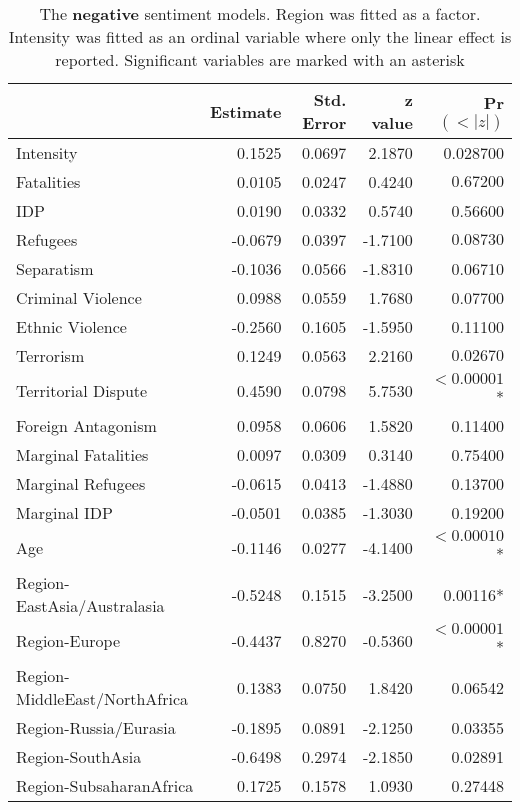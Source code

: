 \begin{table}
\centering
\begin{tabular}{l|rrrr}
& Estimate & Std. Error & z value & Pr$(<|z|)$  \\ \hline
Intensity                   & 0.1525 & 0.0697 & 2.1870 & 0.028700 \\ 
Fatalities                    & 0.0105 &  0.0247 & 0.4240 & $0.67200$ \\ 
IDP                           & 0.0190 & 0.0332 & 0.5740 & 0.56600 \\ 
Refugees                      & -0.0679 & 0.0397 & -1.7100 & $0.08730$ \\ 
Separatism                    & -0.1036 & 0.0566 & -1.8310 & 0.06710 \\ 
Criminal Violence             & 0.0988 & 0.0559 & 1.7680 & 0.07700 \\ 
Ethnic Violence               & -0.2560 & 0.1605 & -1.5950 & 0.11100 \\ 
Terrorism                     & 0.1249 & 0.0563 & 2.2160 &  $0.02670$ \\ 
Territorial Dispute           & 0.4590 & 0.0798 & 5.7530 & $<0.00001$* \\ 
Foreign Antagonism            & 0.0958 & 0.0606 & 1.5820 & 0.11400 \\ 
 Marginal Fatalities           & 0.0097 & 0.0309 & 0.3140 & 0.75400 \\ 
 Marginal Refugees             & -0.0615 & 0.0413 & -1.4880 & 0.13700 \\ 
 Marginal IDP                  & -0.0501 & 0.0385 & -1.3030 & 0.19200 \\ 
 Age                           & -0.1146 & 0.0277 & -4.1400 & $<0.00010$* \\ 
 Region-EastAsia/Australasia   & -0.5248 & 0.1515 & -3.2500 & 0.00116* \\ 
 Region-Europe                 & -0.4437 &  0.8270 & -0.5360 & $<0.00001$* \\ 
 Region-MiddleEast/NorthAfrica & 0.1383 & 0.0750 & 1.8420 & 0.06542 \\ 
 Region-Russia/Eurasia         & -0.1895 & 0.0891 & -2.1250 & 0.03355 \\ 
 Region-SouthAsia              & -0.6498 & 0.2974 & -2.1850 & 0.02891 \\ 
 Region-SubsaharanAfrica       & 0.1725 & 0.1578 & 1.0930 & 0.27448 \\ 
\end{tabular}
\caption{The \textbf{negative} sentiment models. Region was fitted as a factor. Intensity was fitted as an ordinal variable where only the linear effect is reported. Significant variables are marked with an asterisk}
\label{negfix}
\end{table}